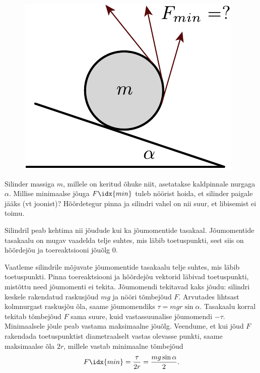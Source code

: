 
\begin{figure}
\vspace{-15pt}
\includegraphics[width=\linewidth]{2013-lahg-08-joonis_niidirull-crop}
\end{figure}

Silinder massiga $m$, millele on keritud õhuke niit, asetatakse kaldpinnale nurgaga $\alpha$.
Millise minimaalse jõuga $F\idx{min}$ tuleb nöörist hoida, et silinder paigale
jääks (vt joonist)? Hõõrdetegur pinna ja silindri vahel on nii suur, et
libisemist ei toimu.

\hint
Silindril peab kehtima nii jõudude kui ka jõumomentide tasakaal. Jõumomentide tasakaalu on mugav vaadelda telje suhtes, mis läbib toetuspunkti, sest siis on hõõrdejõu ja toereaktsiooni jõuõlg \num{0}.

\solu
Vaatleme silindrile mõjuvate jõumomentide tasakaalu telje suhtes, mis läbib toetuspunkti. Pinna toereaktsiooni ja hõõrdejõu vektorid läbivad toetuspunkti, mistõttu need jõumomenti ei tekita. Jõumomendi tekitavad kaks jõudu: silindri keskele rakendatud raskusjõud $mg$ ja nööri tõmbejõud $F$. Arvutades lihtsast kolmnurgast raskusjõu õla, saame jõumomendiks $\tau=mgr\sin\alpha$. Tasakaalu korral tekitab tõmbejõud $F$ sama suure, kuid vastassuunalise jõumomendi $-\tau$. Minimaalsele jõule peab vastama maksimaalne jõuõlg. Veendume, et kui jõud $F$ rakendada toetuspunktist diametraalselt vastas olevasse punkti, saame maksimaalse õla $2r$, millele vastab minimaalne tõmbejõud
\[F\idx{min}=\frac{\tau}{2r}=\frac{mg\sin\alpha}{2}.\]

